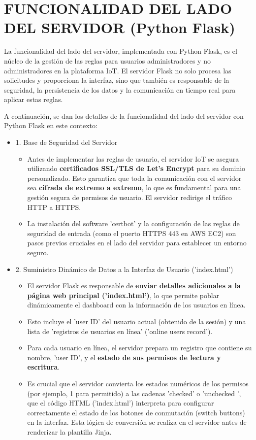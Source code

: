 \documentclass{report}
\begin{document}
\section{FUNCIONALIDAD DEL LADO DEL SERVIDOR (Python Flask)}
La funcionalidad del lado del servidor, implementada con Python Flask, es el núcleo de la gestión de las reglas para usuarios administradores y no 
administradores  en la plataforma IoT. El servidor Flask no solo procesa las solicitudes y proporciona la interfaz, sino que también es responsable de la 
seguridad, la persistencia de los datos y la comunicación en tiempo real para aplicar estas reglas.

A continuación, se dan los detalles de la funcionalidad del lado del servidor con Python Flask en este contexto:
\begin{itemize}
    \item 1. Base de Seguridad del Servidor
    \begin{itemize}
        \item Antes de implementar las reglas de usuario, el servidor IoT se asegura utilizando \textbf{certificados SSL/TLS de Let's Encrypt} para su 
        dominio personalizado. Esto garantiza que toda la comunicación con el servidor sea \textbf{cifrada de extremo a extremo}, lo que es fundamental para 
        una gestión segura de permisos de usuario. El servidor redirige el tráfico HTTP a HTTPS.
        \item La instalación del software 'certbot' y la configuración de las reglas de seguridad de entrada (como el puerto HTTPS 443 en AWS EC2) son pasos 
        previos cruciales en el lado del servidor para establecer un entorno seguro.
    \end{itemize}

    \item 2. Suministro Dinámico de Datos a la Interfaz de Usuario ('index.html')
    \begin{itemize}
        \item El servidor Flask es responsable de \textbf{enviar detalles adicionales a la página web principal ('index.html')}, lo que permite poblar 
        dinámicamente el dashboard con la información de los usuarios en línea.
        \item Esto incluye el 'user ID' del usuario actual (obtenido de la sesión) y una lista de 'registros de usuarios en línea' ('online users record').
        \item Para cada usuario en línea, el servidor prepara un registro que contiene su nombre, 'user ID', y el \textbf{estado de sus permisos de 
        lectura y escritura}.
        \item Es crucial que el servidor convierta los estados numéricos de los permisos (por ejemplo, 1 para permitido) a las cadenas 'checked' o 
         'unchecked ', que el código HTML ('index.html') interpreta para configurar correctamente el estado de los botones de conmutación (switch buttons) 
        en la interfaz. Esta lógica de conversión se realiza en el servidor antes de renderizar la plantilla Jinja.
    \end{itemize}


\end{itemize}
\end{document}

